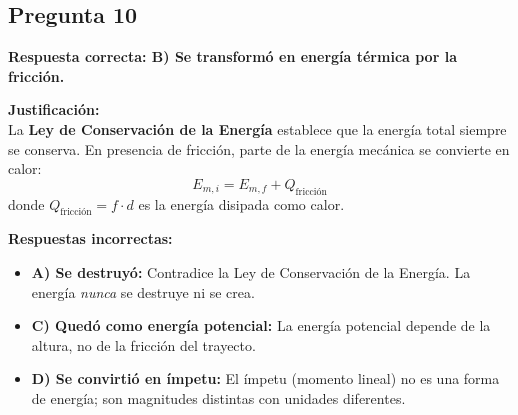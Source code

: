 \begin{respuestabox}
\subsection{Pregunta 10}
\textcolor{verdecorrecto}{\textbf{Respuesta correcta: B) Se transformó en energía térmica por la fricción.}}

\textbf{Justificación:}\\
La \textbf{Ley de Conservación de la Energía} establece que la energía total siempre se conserva. En presencia de fricción, parte de la energía mecánica se convierte en calor:
$$E_{m,i} = E_{m,f} + Q_{\text{fricción}}$$
donde $Q_{\text{fricción}} = f \cdot d$ es la energía disipada como calor.

\textbf{Respuestas incorrectas:}
\begin{itemize}
    \item \textbf{A) Se destruyó:} Contradice la Ley de Conservación de la Energía. La energía \textit{nunca} se destruye ni se crea.
    \item \textbf{C) Quedó como energía potencial:} La energía potencial depende de la altura, no de la fricción del trayecto.
    \item \textbf{D) Se convirtió en ímpetu:} El ímpetu (momento lineal) no es una forma de energía; son magnitudes distintas con unidades diferentes.
\end{itemize}
\end{respuestabox}